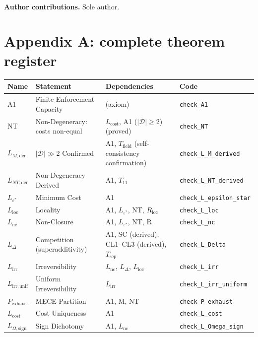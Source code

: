 \documentclass[11pt]{article}
\theoremstyle{remark}
\begin{document}
\noindent\textbf{Author contributions.}  Sole author.

\section{Appendix A: complete theorem register}

\begin{center}
\small
{}
\smallskip
\small
\begin{tabular}{@{}lp{4.2cm}p{3.5cm}l@{}}
\toprule
\textbf{Name} & \textbf{Statement} & \textbf{Dependencies} & \textbf{Code} \\
\midrule
A1 & Finite Enforcement Capacity & (axiom) & \texttt{check\_A1} \\
NT & Non-Degeneracy: costs non-equal & $L_{\mathrm{cost}}$, A1 ($|\mathcal{D}| \ge 2$) (proved) & \texttt{check\_NT} \\
$L_{M,\mathrm{der}}$ & $|\mathcal{D}| \gg 2$ Confirmed & A1, $T_{\mathrm{field}}$ (self-consistency confirmation) & \texttt{check\_L\_M\_derived} \\
$L_{NT,\mathrm{der}}$ & Non-Degeneracy Derived & A1, $T_{11}$ & \texttt{check\_L\_NT\_derived} \\
$L_{\varepsilon^*}$ & Minimum Cost & A1 & \texttt{check\_L\_epsilon\_star} \\
$L_{\mathrm{loc}}$ & Locality & A1, $L_{\varepsilon^*}$, NT, $R_{\mathrm{loc}}$ & \texttt{check\_L\_loc} \\
$L_{\mathrm{nc}}$ & Non-Closure & A1, $L_{\varepsilon^*}$, NT, R & \texttt{check\_L\_nc} \\
$L_\Delta$ & Competition (superadditivity) & A1, SC (derived), CL1--CL3 (derived), $T_{\mathrm{sep}}$ & \texttt{check\_L\_Delta} \\
$L_{\mathrm{irr}}$ & Irreversibility & $L_{\mathrm{nc}}$, $L_\Delta$, $L_{\mathrm{loc}}$ & \texttt{check\_L\_irr} \\
$L_{\mathrm{irr,unif}}$ & Uniform Irreversibility & $L_{\mathrm{irr}}$ & \texttt{check\_L\_irr\_uniform} \\
$P_{\mathrm{exhaust}}$ & MECE Partition & A1, M, NT & \texttt{check\_P\_exhaust} \\
$L_{\mathrm{cost}}$ & Cost Uniqueness & A1 & \texttt{check\_L\_cost} \\
$L_{\Omega,\mathrm{sign}}$ & Sign Dichotomy & A1, $L_{\mathrm{nc}}$ & \texttt{check\_L\_Omega\_sign} \\

\end{tabular}
\end{center}
\end{document}

